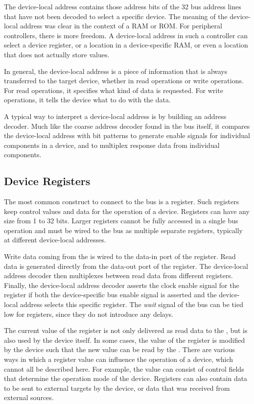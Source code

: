 The device-local address contains those address bits of the 32 bus address lines that have not been decoded to select a specific device. The meaning of the device-local address was clear in the context of a RAM or ROM. For peripheral controllers, there is more freedom. A device-local address in such a controller can select a device register, or a location in a device-specific RAM, or even a location that does not actually store values.

In general, the device-local address is a piece of information that is always transferred to the target device, whether in read operations or write operations. For read operations, it specifies what kind of data is requested. For write operations, it tells the device what to do with the data.

A typical way to interpret a device-local address is by building an address decoder. Much like the coarse address decoder found in the bus itself, it compares the device-local address with bit patterns to generate enable signals for individual components in a device, and to multiplex response data from individual components.

\subsection{Device Registers}

The most common construct to connect to the bus is a register. Such registers keep control values and data for the operation of a device. Registers can have any size from 1 to 32 bits. Larger registers cannot be fully accessed in a single bus operation and must be wired to the bus as multiple separate registers, typically at different device-local addresses.

Write data coming from the \eco is wired to the data-in port of the register. Read data is generated directly from the data-out port of the register. The device-local address decoder then multiplexes between read data from different registers. Finally, the device-local address decoder asserts the clock enable signal for the register if both the device-specific bus enable signal is asserted and the device-local address selects this specific register. The {\it wait} signal of the bus can be tied low for registers, since they do not introduce any delays.

The current value of the register is not only delivered as read data to the \ecox, but is also used by the device itself. In some cases, the value of the register is modified by the device such that the new value can be read by the \ecox. There are various ways in which a register value can influence the operation of a device, which cannot all be described here. For example, the value can consist of control fields that determine the operation mode of the device. Registers can also contain data to be sent to external targets by the device, or data that was received from external sources.

